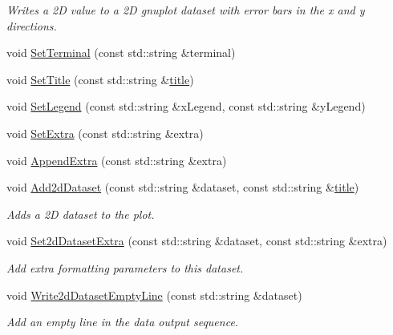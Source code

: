 \begin{DoxyCompactItemize}
\begin{DoxyCompactList}\small\item\em Writes a 2D value to a 2D gnuplot dataset with error bars in the x and y directions. \end{DoxyCompactList}\item 
void \hyperlink{classns3_1_1GnuplotAggregator_aa2baf977d56457f8ddd90bb9e894330c}{Set\+Terminal} (const std\+::string \&terminal)
\item 
void \hyperlink{classns3_1_1GnuplotAggregator_aeb7dc3fbf50daee634e864a88151a370}{Set\+Title} (const std\+::string \&\hyperlink{lte__link__budget__x2__handover__measures_8m_a3f4b991df405379f6917e1683ed5a8c8}{title})
\item 
void \hyperlink{classns3_1_1GnuplotAggregator_ab43df746995f484fa6d7902e6dc4b8e2}{Set\+Legend} (const std\+::string \&x\+Legend, const std\+::string \&y\+Legend)
\item 
void \hyperlink{classns3_1_1GnuplotAggregator_afdd798eef1681f542f67ae278a2ee0de}{Set\+Extra} (const std\+::string \&extra)
\item 
void \hyperlink{classns3_1_1GnuplotAggregator_a3548239dc6b3466fc4bf963597a3d6c3}{Append\+Extra} (const std\+::string \&extra)
\item 
void \hyperlink{classns3_1_1GnuplotAggregator_aa97aca4e26a515ff435d783f32a03776}{Add2d\+Dataset} (const std\+::string \&dataset, const std\+::string \&\hyperlink{lte__link__budget__x2__handover__measures_8m_a3f4b991df405379f6917e1683ed5a8c8}{title})
\begin{DoxyCompactList}\small\item\em Adds a 2D dataset to the plot. \end{DoxyCompactList}\item 
void \hyperlink{classns3_1_1GnuplotAggregator_a29ee88e6b9494826e6542f3ef8dc7de8}{Set2d\+Dataset\+Extra} (const std\+::string \&dataset, const std\+::string \&extra)
\begin{DoxyCompactList}\small\item\em Add extra formatting parameters to this dataset. \end{DoxyCompactList}\item 
void \hyperlink{classns3_1_1GnuplotAggregator_a006f2d0a4fa98afdd37dfe10a27a60c9}{Write2d\+Dataset\+Empty\+Line} (const std\+::string \&dataset)
\begin{DoxyCompactList}\small\item\em Add an empty line in the data output sequence. \end{DoxyCompactList}\item 

\end{DoxyCompactItemize}
